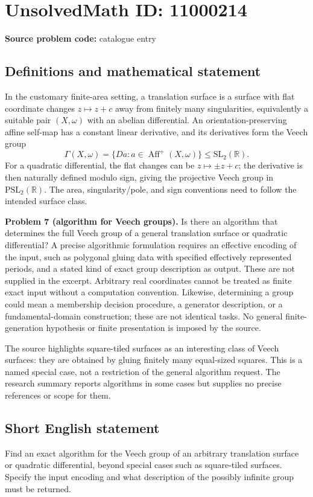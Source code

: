 \documentclass[11pt]{article}
\newcommand{\R}{\mathbb{R}}
\begin{document}
\section*{UnsolvedMath ID: 11000214}
\textbf{Source problem code:} catalogue entry
\subsection{Definitions and mathematical statement}
In the customary finite-area setting, a translation surface is a surface with flat coordinate changes $z\mapsto z+c$ away from finitely many singularities, equivalently a suitable pair $(X,\omega)$ with an abelian differential. An orientation-preserving affine self-map has a constant linear derivative, and its derivatives form the Veech group
\[
 \Gamma(X,\omega)=\{D a:a\in\operatorname{Aff}^+(X,\omega)\}\le\mathrm{SL}_2(\R).
\]
For a quadratic differential, the flat changes can be $z\mapsto\pm z+c$; the derivative is then naturally defined modulo sign, giving the projective Veech group in $\mathrm{PSL}_2(\R)$. The area, singularity/pole, and sign conventions need to follow the intended surface class.

\textbf{Problem 7 (algorithm for Veech groups).} Is there an algorithm that determines the full Veech group of a general translation surface or quadratic differential? A precise algorithmic formulation requires an effective encoding of the input, such as polygonal gluing data with specified effectively represented periods, and a stated kind of exact group description as output. These are not supplied in the excerpt. Arbitrary real coordinates cannot be treated as finite exact input without a computation convention. Likewise, determining a group could mean a membership decision procedure, a generator description, or a fundamental-domain construction; these are not identical tasks. No general finite-generation hypothesis or finite presentation is imposed by the source.

The source highlights square-tiled surfaces as an interesting class of Veech surfaces: they are obtained by gluing finitely many equal-sized squares. This is a named special case, not a restriction of the general algorithm request. The research summary reports algorithms in some cases but supplies no precise references or scope for them.
\subsection{Short English statement}
Find an exact algorithm for the Veech group of an arbitrary translation surface or quadratic differential, beyond special cases such as square-tiled surfaces. Specify the input encoding and what description of the possibly infinite group must be returned.
\end{document}
